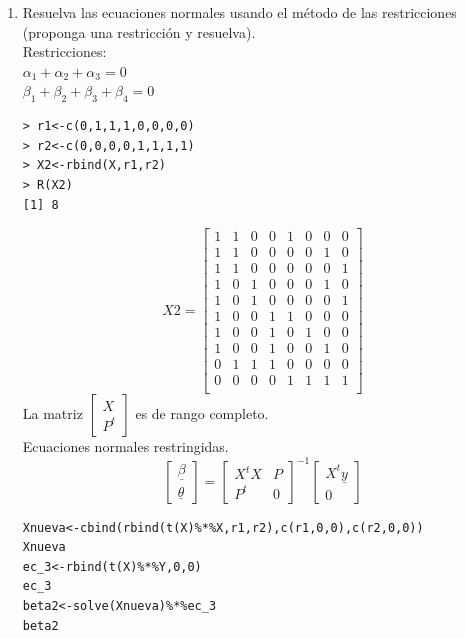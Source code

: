 \documentclass[10pt,a4paper]{report}
\begin{document}
\begin{enumerate}
\item[d)] Resuelva las ecuaciones normales usando el método de las restricciones (proponga una restricción y resuelva).\\

Restricciones:\\
 $\alpha_1+\alpha_2+\alpha_3=0$\\
 $\beta_1+\beta_2+\beta_3+\beta_4=0$\\
 
\begin{verbatim}
> r1<-c(0,1,1,1,0,0,0,0)
> r2<-c(0,0,0,0,1,1,1,1)
> X2<-rbind(X,r1,r2)
> R(X2)
[1] 8
\end{verbatim} 
\begin{equation*}
X2=\begin{bmatrix}
1&1&0&0&1&0&0&0\\
1&1&0&0&0&0&1&0\\
1&1&0&0&0&0&0&1\\
1&0&1&0&0&0&1&0\\
1&0&1&0&0&0&0&1\\
1&0&0&1&1&0&0&0\\
1&0&0&1&0&1&0&0\\
1&0&0&1&0&0&1&0\\
0&1&1&1&0&0&0&0\\
0&0&0&0&1&1&1&1\\
\end{bmatrix}
\end{equation*}
La matriz $\begin{bmatrix}
X \\ P^t
\end{bmatrix}$ es de rango completo.\\

Ecuaciones normales restringidas.\\
\[\begin{bmatrix}
\underline{\beta} \\ \underline{\theta} 
\end{bmatrix} = \begin{bmatrix}
X^tX & P\\
P^t & 0 
\end{bmatrix}^{-1} \begin{bmatrix}
X^t\underline{y} \\ 0
\end{bmatrix}\]

\begin{verbatim}
Xnueva<-cbind(rbind(t(X)%*%X,r1,r2),c(r1,0,0),c(r2,0,0))
Xnueva
ec_3<-rbind(t(X)%*%Y,0,0)
ec_3
beta2<-solve(Xnueva)%*%ec_3
beta2
\end{verbatim}


\end{enumerate}
\end{document}
